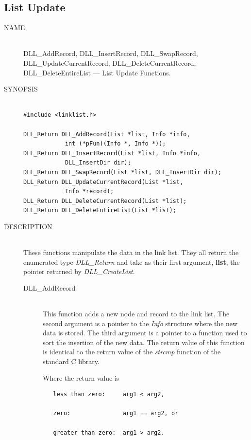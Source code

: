 \documentclass[10pt,letterpaper,titlepage]{article}
\begin{document}
\subsection{List Update}
\begin{description}
\item[NAME]\quad\\
DLL\_AddRecord, DLL\_InsertRecord, DLL\_SwapRecord,\\
DLL\_UpdateCurrentRecord, DLL\_DeleteCurrentRecord,\\
DLL\_DeleteEntireList --- List Update Functions.

\item[SYNOPSIS]
\begin{verbatim}

#include <linklist.h>

DLL_Return DLL_AddRecord(List *list, Info *info,
            int (*pFun)(Info *, Info *));
DLL_Return DLL_InsertRecord(List *list, Info *info,
            DLL_InsertDir dir);
DLL_Return DLL_SwapRecord(List *list, DLL_InsertDir dir);
DLL_Return DLL_UpdateCurrentRecord(List *list,
            Info *record);
DLL_Return DLL_DeleteCurrentRecord(List *list);
DLL_Return DLL_DeleteEntireList(List *list);
\end{verbatim}

\item[DESCRIPTION]\quad\\
These functions manipulate the data in the link list.  They all return the enumerated type \emph{DLL\_Return} and take as their first argument, \textbf{list}, the pointer returned by \emph{DLL\_CreateList}.

 \begin{description}
 \item[DLL\_AddRecord]\quad\\
 This function adds a new node and record to the link list.  The second argument is a pointer to the \emph{Info} structure where the new data is stored.  The third argument is a pointer to a function used to sort the insertion of the new data.  The return value of this function is identical to the return value of the \emph{strcmp} function of the standard C library.
 \vspace{8pt}

 Where the return value is
\begin{verbatim}
   less than zero:     arg1 < arg2,

   zero:               arg1 == arg2, or

   greater than zero:  arg1 > arg2.
\end{verbatim}


\end{description}
\end{description}
\end{document}
